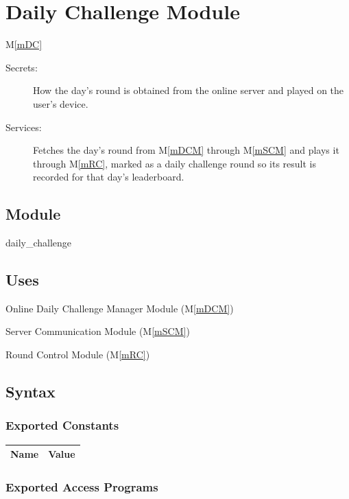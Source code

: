 \documentclass[12pt, titlepage]{article}
\newcommand{\mref}[1]{M\ref{#1}}
\begin{document}
\newpage

\section{Daily Challenge Module} \mref{mDC} 


\begin{description}
\item[Secrets:] How the day's round is obtained from the online server and played on the user's device.
\item[Services:] Fetches the day's round from \mref{mDCM} through \mref{mSCM} and plays it through \mref{mRC}, marked as a daily challenge round so its result is recorded for that day's leaderboard.
\end{description}

\subsection{Module}

daily\_challenge

\subsection{Uses}

Online Daily Challenge Manager Module (\mref{mDCM})

Server Communication Module (\mref{mSCM})

Round Control Module (\mref{mRC})

\subsection{Syntax}

\subsubsection{Exported Constants}

\begin{center}
\begin{tabular}{p{10cm} p{4cm}}
\hline
\textbf{Name} & \textbf{Value}\\
\hline


\hline
\end{tabular}
\end{center}

\subsubsection{Exported Access Programs}
\end{document}
